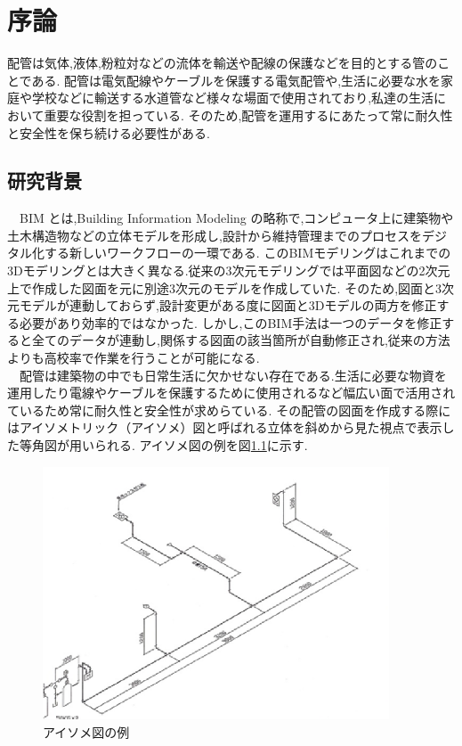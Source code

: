 \chapter{序論}
配管は気体,液体,粉粒対などの流体を輸送や配線の保護などを目的とする管のことである.
配管は電気配線やケーブルを保護する電気配管や,生活に必要な水を家庭や学校などに輸送する水道管など様々な場面で使用されており,私達の生活において重要な役割を担っている.
そのため,配管を運用するにあたって常に耐久性と安全性を保ち続ける必要性がある. \\

\section{研究背景}
　BIM とは,Building Information Modeling の略称で,コンピュータ上に建築物や土木構造物などの立体モデルを形成し,設計から維持管理までのプロセスをデジタル化する新しいワークフローの一環である.
このBIMモデリングはこれまでの3Dモデリングとは大きく異なる.従来の3次元モデリングでは平面図などの2次元上で作成した図面を元に別途3次元のモデルを作成していた.
そのため,図面と3次元モデルが連動しておらず,設計変更がある度に図面と3Dモデルの両方を修正する必要があり効率的ではなかった.
しかし,このBIM手法は一つのデータを修正すると全てのデータが連動し,関係する図面の該当箇所が自動修正され,従来の方法よりも高校率で作業を行うことが可能になる.\\
　配管は建築物の中でも日常生活に欠かせない存在である.生活に必要な物資を運用したり電線やケーブルを保護するために使用されるなど幅広い面で活用されているため常に耐久性と安全性が求めらている.
その配管の図面を作成する際にはアイソメトリック（アイソメ）図と呼ばれる立体を斜めから見た視点で表示した等角図が用いられる.
アイソメ図の例を図\ref{fig:f1}に示す.
\begin{figure}[htbt]
	\centering
	 \includegraphics[height=75mm]{Figure/ex_iso.eps}
	 \caption{アイソメ図の例}
	 \label{fig:f1}
\end{figure}

